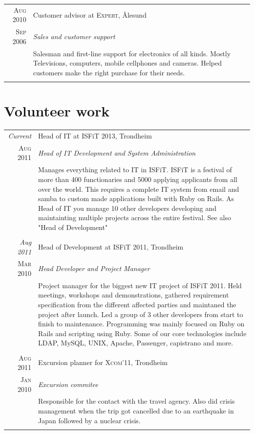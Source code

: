 \documentclass[a4paper,10pt]{article}
\begin{document}
\begin{tabular}{r|p{12cm}}
  \textsc{Aug 2010} & Customer advisor at \textsc{Expert}, Ålesund \\\textsc{Sep 2006}&\emph{Sales and customer support}\\&\footnotesize{Salesman and first-line support for electronics of all kinds. Mostly Televisions, computers, mobile cellphones and cameras. Helped customers make the right purchase for their needs.}\\\multicolumn{2}{c}{} \\
\end{tabular}

\section{Volunteer work}
\begin{tabular}{r|p{12cm}}
  \emph{Current} & Head of IT at ISFiT 2013, Trondheim  \\\textsc{Aug 2011}&\emph{Head of IT Development and System Administration}\\&\footnotesize{Manages everything related to IT in ISFiT. ISFiT is a festival of more than 400 functionaries and 5000 applying applicants from all over the world. This requires a complete IT system from email and samba to custom made applications built with Ruby on Rails. As Head of IT you manage 10 other developers developing and maintainting multiple projects across the entire festival. See also "Head of Development"}\\\multicolumn{2}{c}{} \\
  \emph{Aug 2011} & Head of Development at ISFiT 2011, Trondheim  \\\textsc{Mar 2010}&\emph{Head Developer and Project Manager}\\&\footnotesize{Project manager for the biggest new IT project of ISFiT 2011. Held meetings, workshops and demonstrations, gathered requirement specification from the different affected parties and maintaned the project after launch. Led a group of 3 other developers from start to finish to maintenance. Programming was mainly focused on Ruby on Rails and scripting using Ruby. Some of our core technologies include LDAP, MySQL, UNIX, Apache, Passenger, capistrano and more.}\\\multicolumn{2}{c}{} \\
  \textsc{Aug 2011}& Excursion planner for \textsc{Xcom'11}, Trondheim \\\textsc{Jan 2010}& \emph{Excursion commitee}\\&\footnotesize{Responsible for the contact with the travel agency. Also did crisis management when the trip got cancelled due to an earthquake in Japan followed by a nuclear crisis.}\\\multicolumn{2}{c}{} \\
\end{tabular}
\end{document}
